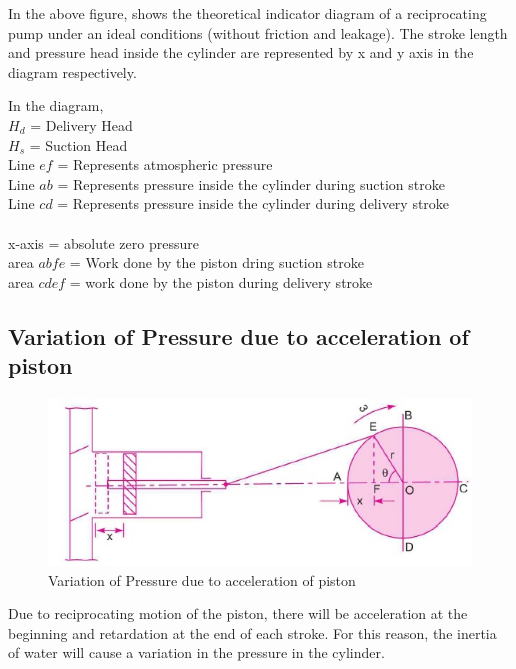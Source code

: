 \documentclass{article}
\begin{document}
  In the above figure, shows the theoretical indicator diagram of a reciprocating pump under an ideal conditions (without friction and leakage). The stroke length and pressure head inside the cylinder are represented by x and y axis in the diagram respectively. 

  \begin{multicols}{2}
    In the diagram,\\
    $H_d$ = Delivery Head \\
    $H_s$ = Suction Head \\ 
    Line $ef$ = Represents atmospheric pressure \\
    Line $ab$ = Represents pressure inside the cylinder during suction stroke \\
    Line $cd$ = Represents pressure inside the cylinder during delivery stroke \\
    \\
    x-axis = absolute zero pressure \\
    area $abfe$ = Work done by  the piston dring suction stroke \\
    area $cdef$ = work done by the piston during delivery stroke \\
  \end{multicols}

  \subsection*{Variation of Pressure due to acceleration of piston }
  \begin{figure}[h]
    \begin{center}
      \includegraphics[width=0.7\linewidth]{img/acceleration_piston.jpg}
      \caption{Variation of Pressure due to acceleration of piston}
    \end{center}
  \end{figure}
  Due to reciprocating motion of the piston, there will be acceleration at the beginning and retardation at the end of each stroke. For this reason, the inertia of water will cause a variation in the pressure in the cylinder.
\end{document}
